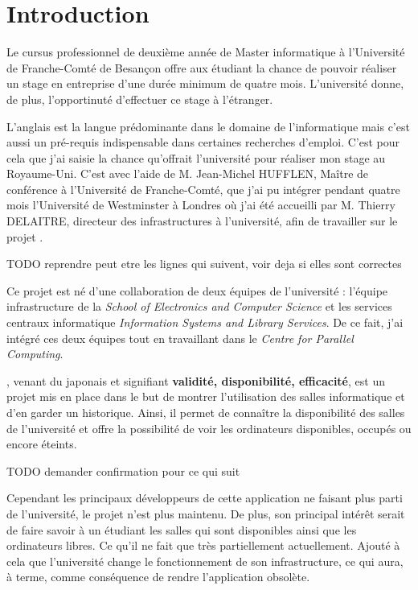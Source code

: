 \chapter{Introduction}

Le cursus professionnel de deuxi\`eme ann\'ee de Master informatique \`a l'Universit\'e de Franche-Comt\'e de Besan\c{c}on offre aux \'etudiant la chance de pouvoir r\'ealiser un stage en entreprise d'une dur\'ee minimum de quatre mois. 
L'universit\'e donne, de plus, l'opportinut\'e d'effectuer ce stage \`a l'\'etranger.

L'anglais est la langue pr\'edominante dans le domaine de l'informatique mais c'est aussi un pr\'e-requis indispensable dans certaines recherches d'emploi.
C'est pour cela que j'ai saisie la chance qu'offrait l'universit\'e pour r\'ealiser mon stage au Royaume-Uni. 
C'est avec l'aide de M. Jean-Michel HUFFLEN, Ma\^itre de conf\'erence \`a l'Universit\'e de Franche-Comt\'e, que j'ai pu int\'egrer pendant quatre mois l'Universit\'e de Westminster \`a Londres o\`u j'ai \'et\'e accueilli par M. Thierry DELAITRE, directeur des infrastructures \`a l'universit\'e, afin de travailler sur le projet \YuukouII.

TODO reprendre peut etre les lignes qui suivent, voir deja si elles sont correctes

Ce projet est n\'e d'une collaboration de deux \'equipes de l'universit\'e : l'\'equipe infrastructure de la \textit{School of Electronics and Computer Science} et les services centraux informatique \textit{Information Systems and Library Services}. 
De ce fait, j'ai int\'egr\'e ces deux \'equipes tout en travaillant dans le \textit{Centre for Parallel Computing}.

\Yuukou, venant du japonais et signifiant \textbf{validit\'e, disponibilit\'e, efficacit\'e}, est un projet mis en place dans le but de montrer l'utilisation des salles informatique et d'en garder un historique.
Ainsi, il permet de conna\^itre la disponibilit\'e des salles de l'universit\'e et offre la possibilit\'e de voir les ordinateurs disponibles, occup\'es ou encore \'eteints.

TODO demander confirmation pour ce qui suit

Cependant les principaux d\'eveloppeurs de cette application ne faisant plus parti de l'universit\'e, le projet n'est plus maintenu.
De plus, son principal int\'er\^et serait de faire savoir \`a un \'etudiant les salles qui sont disponibles ainsi que les ordinateurs libres.
Ce qu'il ne fait que tr\`es partiellement actuellement.
Ajout\'e \`a cela que l'universit\'e change le fonctionnement de son infrastructure, ce qui aura, \`a terme, comme cons\'equence de rendre l'application obsol\`ete.

